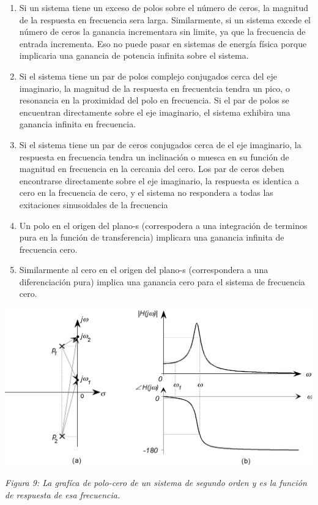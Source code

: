 \documentclass[10pt,a4paper]{article}
\begin{document}
\begin{enumerate}
  \item Si un sistema tiene un exceso de polos sobre el número de ceros, la magnitud de la respuesta en frecuencia sera larga. Similarmente, si un sistema excede el número de ceros la ganancia incrementara sin limite, ya que la frecuencia de entrada incrementa. Eso no puede pasar en sistemas de energía física porque implicaria una ganancia de potencia infinita sobre el sistema.
  \item Si el sistema tiene un par de polos complejo conjugados cerca del eje imaginario, la magnitud de la respuesta en frecuentcia tendra un pico, o resonancia en la proximidad del polo en frecuencia. Si el par de polos se encuentran directamente sobre el eje imaginario, el sistema exhibira una ganancia infinita en frecuencia.
  \item Si el sistema tiene un par de ceros conjugados cerca de el eje imaginario, la respuesta en frecuencia tendra un inclinación o muesca en su función de magnitud en frecuencia en la cercania del cero. Los par de ceros deben encontrarse directamente sobre el eje imaginario, la respuesta es identica a cero en la frecuencia de cero, y el sistema no respondera a todas las exitaciones sinusoidales de la frecuencia
  \item Un polo en el origen del plano-s (correspodera a una integración de terminos pura en la función de transferencia) implicara una ganancia infinita de frecuencia cero.
  \item Similarmente al cero en el origen del plano-s (correspondera a una diferenciación pura) implica una ganancia cero para el sistema de frecuencia cero.
\end{enumerate}
\clearpage
\begin{center}
  \includegraphics[scale=0.25]{img/figura9.png}
\end{center}
\textit{Figura 9: La grafíca de polo-cero de un sistema de segundo orden y es la función de respuesta de esa frecuencia.}
\end{document}
